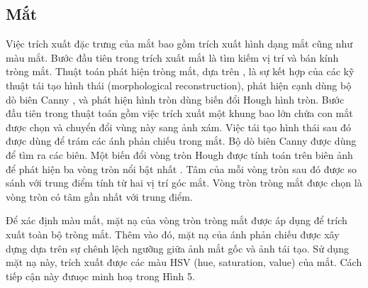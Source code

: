 \documentclass[conference]{IEEEtran}
\begin{document}
\subsection{Mắt}

Việc trích xuất đặc trưng của mắt bao gồm trích xuất hình dạng mắt cũng như màu mắt. Bước đầu tiên trong trích xuất mắt là tìm kiếm vị trí và bán kính tròng mắt. Thuật toán phát hiện tròng mắt, dựa trên \cite{ref:r4}, là sự kết hợp của các kỹ thuật tái tạo hình thái (morphological reconstruction), phát hiện cạnh dùng bộ dò biên Canny \cite{ref:r6}, và phát hiện hình tròn dùng biến đổi Hough hình tròn. Bước đầu tiên trong thuật toán gồm việc trích xuất một khung bao lớn chứa con mắt được chọn và chuyển đổi vùng này sang ảnh xám. Việc tái tạo hình thái sau đó được dùng để trám các ánh phản chiếu trong mắt. Bộ dò biên Canny được dùng để tìm ra các biên. Một biến đổi vòng tròn Hough được tính toán trên biên ảnh để phát hiện ba vòng tròn nổi bật nhất \cite{ref:r7}. Tâm của mỗi vòng tròn sau đó được so sánh với trung điểm tính từ hai vị trí góc mắt. Vòng tròn tròng mắt được chọn là vòng tròn có tâm gần nhất với trung điểm.

Để xác định màu mắt, mặt nạ của vòng tròn tròng mắt được áp dụng để trích xuất toàn bộ tròng mắt. Thêm vào đó, mặt nạ của ánh phản chiếu được xây dựng dựa trên sự chênh lệch ngưỡng giữa ảnh mắt gốc và ảnh tái tạo. Sử dụng mặt nạ này, trích xuất được các màu HSV (hue, saturation, value) của mắt. Cách tiếp cận này đưuọc minh hoạ trong Hình 5.
\end{document}

